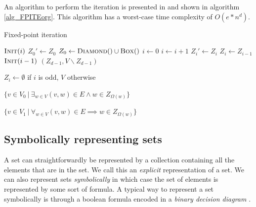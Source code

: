 An algorithm to perform the iteration is presented in \cite{FPITE} and shown in algorithm \ref{alg_FPITEorg}. This algorithm has a worst-case time complexity of $O(e * n ^d)$.
\begin{algorithm}
	\caption{Fixed-point iteration}
	\label{alg_FPITEorg}
	\begin{multicols}{2}
		\begin{algorithmic}[1]
			\State $\textsc{Init}(i)$
			\EndFor
			\Repeat
			\State $Z_0'\gets Z_0$
			\State $Z_0 \gets \textsc{Diamond}() \cup \textsc{Box}()$
			\State $i \gets 0$
			\State $i \gets i+1$
			\State $Z_i' \gets Z_i$
			\State $Z_i \gets Z_{i-1}$
			\State $\textsc{Init}(i-1)$
			\EndWhile
			\State \Return $(Z_{d-1},V\backslash Z_{d-1})$
			\EndFunction
		\end{algorithmic}\bigskip\bigskip
		\begin{algorithmic}[1]
			\Function{Init}{$i$}
			\State $Z_i \gets \emptyset$ if $i$ is odd, $V$ otherwise
			\EndFunction
		\end{algorithmic}\bigskip
		\begin{algorithmic}[1]
			\Function{Diamond}{}
			\State \Return $\{ v \in V_0\ |\ \exists_{w\in V} (v,w) \in E \wedge w \in Z_{\Omega(w)}\}$
			\EndFunction
		\end{algorithmic}\bigskip
		\begin{algorithmic}[1]
			\Function{Box}{}
			\State \Return $\{ v \in V_1\ |\ \forall_{w\in V} (v,w) \in E \implies w \in Z_{\Omega(w)}\}$
			\EndFunction
		\end{algorithmic}
	\end{multicols}
\end{algorithm}

\subsection{Symbolically representing sets}
A set can straightforwardly be represented by a collection containing all the elements that are in the set. We call this an \textit{explicit} representation of a set. We can also represent sets \textit{symbolically} in which case the set of elements is represented by some sort of formula. A typical way to represent a set symbolically is through a boolean formula encoded in a \textit{binary decision diagram} \cite{BDD_book,Handbook_BDD_Chapter}. 

